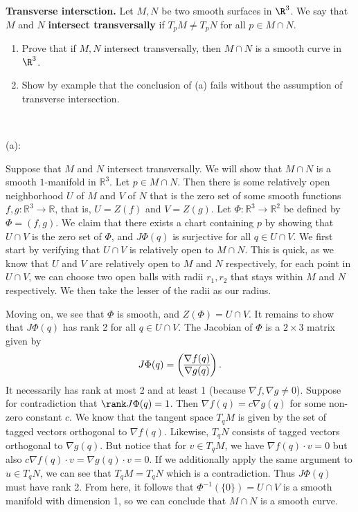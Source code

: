 \documentclass{../../../tex-setup/eh-homework}
\begin{document}
    \begin{question}{43}
        \textbf{Transverse intersction.} Let $M,N$ be two smooth surfaces in $\R^3$. We say that $M$ and $N$ \textbf{intersect transversally} if $T_pM\neq T_pN$ for all $p\in M\cap N$.
    
        \begin{enumerate}[label=(\alph*)]
            \item Prove that if $M,N$ intersect transversally, then $M\cap N$ is a smooth curve in $\R^3$.
            \item Show by example that the conclusion of (a) fails without the assumption of transverse intersection.
        \end{enumerate}
        \tcblower
        \ 

        (a):

        Suppose that \(M\) and \(N\) intersect transversally. We will show that \(M \cap N\) is a smooth \(1\)-manifold in \(\mathbb{R}^3\). Let \(p \in M \cap N\). Then there is some relatively open neighborhood \(U\) of \(M\) and \(V\) of \(N\) that is the zero set of some smooth functions \(f,g: \mathbb{R}^3 \to \mathbb{R}\), that is, \(U = Z(f)\) and \(V = Z(g)\). Let \(\Phi : \mathbb{R}^3 \to \mathbb{R}^2\) be defined by \(\Phi = (f,g)\). We claim that there exists a chart containing \(p\) by showing that \(U\cap V\) is the zero set of \(\Phi\), and \(J \Phi(q)\) is surjective for all \(q \in U \cap V\). We first start by verifying that \(U \cap V\) is relatively open to \(M \cap N\). This is quick, as we know that \(U\) and \(V\) are relatively open to \(M\) and \(N\) respectively, for each point in \(U \cap V\), we can choose two open balls with radii \(r_1,r_2\) that stays within \(M\) and \(N\) respectively. We then take the lesser of the radii as our radius.

        Moving on, we see that \(\Phi\) is smooth, and \(Z(\Phi) = U \cap V\). It remains to show that \(J \Phi (q)\) has rank 2 for all \(q \in U \cap V\). The Jacobian of \(\Phi\) is a \(2 \times 3\) matrix given by
        \[
            J \Phi (q) = \left( \begin{array}{@{}c@{}}
                \nabla f(q) \\
                \hline
                \nabla g(q) \\
            \end{array} \right).
        \]
        It necessarily has rank at most 2 and at least 1 (because \(\nabla f, \nabla g \neq 0\)). Suppose for contradiction that \(\rank J \Phi (q) = 1\). Then \(\nabla f(q) = c \nabla g(q)\) for some non-zero constant \(c\). We know that the tangent space \(T_q M\) is given by the set of tagged vectors orthogonal to \(\nabla f(q)\). Likewise, \(T_q N\) consists of tagged vectors orthogonal to \(\nabla g(q)\). But notice that for \(v \in T_q M\), we have \(\nabla f(q) \cdot v = 0\) but also \(c \nabla f(q) \cdot v = \nabla g(q) \cdot v = 0\). If we additionally apply the same argument to \(u \in T_q N\), we can see that \(T_q M = T_q N\) which is a contradiction. Thus \(J \Phi (q)\) must have rank 2. From here, it follows that \(\Phi ^{-1}(\{ 0 \}) = U \cap V\) is a smooth manifold with dimension 1, so we can conclude that \(M \cap N\) is a smooth curve.


\end{question}
\end{document}
